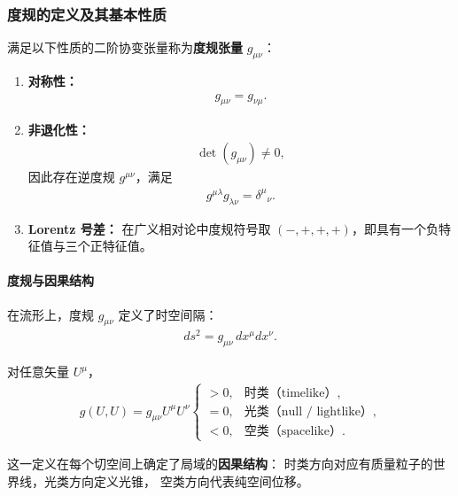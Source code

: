   \subsubsection{度规的定义及其基本性质}
\begin{definition}[度规张量]
  满足以下性质的二阶协变张量称为\textbf{度规张量} $g_{\mu\nu}$：
  \begin{enumerate}[label=(\arabic*)]
    \item \textbf{对称性：} 
    \begin{align}
    g_{\mu\nu} = g_{\nu\mu}.
    \end{align}

    \item \textbf{非退化性：}
    \begin{align}
    \det(g_{\mu\nu}) \neq 0,
    \end{align}
    因此存在逆度规 $g^{\mu\nu}$，满足
    \begin{align}
    g^{\mu\lambda} g_{\lambda\nu} = \delta^{\mu}{}_{\nu}.
    \end{align}

    \item \textbf{Lorentz 号差：} 
    在广义相对论中度规符号取 $(-,+,+,+)$，即具有一个负特征值与三个正特征值。
  \end{enumerate}

\end{definition}

\paragraph{度规与因果结构}

在流形上，度规 $g_{\mu\nu}$ 定义了时空间隔：
\begin{align}
ds^2 = g_{\mu\nu}\,dx^{\mu} dx^{\nu}.
\end{align}


对任意矢量 $U^{\mu}$，
\begin{align}
g(U,U) = g_{\mu\nu} U^{\mu} U^{\nu}
\begin{cases}
>0, & \text{时类（timelike）},\\
=0, & \text{光类（null / lightlike）},\\
<0, & \text{空类（spacelike）}.
\end{cases}
\end{align}

这一定义在每个切空间上确定了局域的\textbf{因果结构}：
时类方向对应有质量粒子的世界线，光类方向定义光锥，
空类方向代表纯空间位移。


